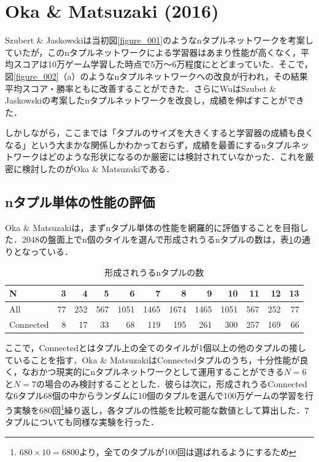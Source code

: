 \documentclass{suribt}
\begin{document}
\section{Oka \& Matsuzaki (2016)}
Szubert \& Jaskowskiは当初図\ref{figure_001}のようなnタプルネットワークを考案していたが，このnタプルネットワークによる学習器はあまり性能が高くなく，平均スコアは10万ゲーム学習した時点で5万〜6万程度にとどまっていた．そこで，図\ref{figure_002}（a）のようなnタプルネットワークへの改良が行われ，その結果平均スコア・勝率ともに改善することができた．さらにWuはSzubet \& Jaskowskiの考案したnタプルネットワークを改良し，成績を伸ばすことができた．

しかしながら，ここまでは「タプルのサイズを大きくすると学習器の成績も良くなる」という大まかな関係しかわかっておらず，成績を最善にするnタプルネットワークはどのような形状になるのか厳密には検討されていなかった．これを厳密に検討したのがOka \& Matsuzakiである．

\subsection{nタプル単体の性能の評価}
Oka \& Matsuzakiは，まずnタプル単体の性能を網羅的に評価することを目指した．2048の盤面上でn個のタイルを選んで形成されうるnタプルの数は，表\ref{tab:ntuplesNumber}の通りとなっている．

\begin{table}[t]
	\begin{center}
		\caption{形成されうるnタプルの数}
		\begin{tabular}{l|r|r|r|r|r|r|r|r|r|r|r} \hline
		N & 3 & 4 & 5 & 6 & 7 & 8 & 9 & 10 & 11 & 12 & 13 \\ \hline \hline
		All & 77 & 252 & 567 & 1051 & 1465 & 1674 & 1465 & 1051 & 567 & 252 & 77 \\ \hline
		Connected & 8 & 17 & 33 & 68 & 119 & 195 & 261 & 300 & 257 & 169 & 66 \\ \hline
		\end{tabular}
		\label{tab:ntuplesNumber}
	\end{center}
\end{table}

ここで，Connectedとはタプル上の全てのタイルが1個以上の他のタプルの接していることを指す．Oka \& MatsuzakiはConnectedタプルのうち，十分性能が良く，なおかつ現実的にnタプルネットワークとして運用することができる$N=6$と$N=7$の場合のみ検討することとした．彼らは次に，形成されうるConnectedな6タプル68個の中からランダムに10個のタプルを選んで100万ゲームの学習を行う実験を680回\footnote{$680 \times 10 = 6800$より，全てのタプルが100回は選ばれるようにするため}繰り返し，各タプルの性能を比較可能な数値として算出した．7タプルについても同様な実験を行った．
\end{document}
